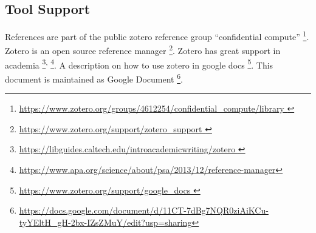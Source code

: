 \subsection{Tool Support}

References are part of the public zotero reference group  “confidential compute”
\footnote{\url{https://www.zotero.org/groups/4612254/confidential_compute/library }}.
Zotero is an open source reference manager
\footnote{\url{https://www.zotero.org/support/zotero_support }}.
Zotero has great support in academia
\footnote{\url{https://libguides.caltech.edu/introacademicwriting/zotero }}\textsuperscript{,}
\footnote{\url{https://www.apa.org/science/about/psa/2013/12/reference-manager}}.
A description on how to use zotero in google docs 
\footnote{\url{https://www.zotero.org/support/google_docs }}.
This document is maintained as Google Document
\footnote{\url{https://docs.google.com/document/d/11CT-7dBg7NQR0ziAiKCu-tyYEltH_gH-2bx-IZsZMuY/edit?usp=sharing}}.


